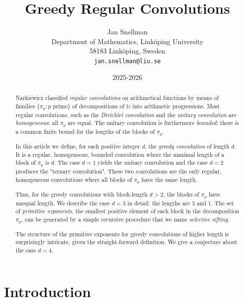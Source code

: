 \documentclass[12pt]{article}
\author{Jan Snellman \\ Department of Mathematics, Link{\"o}ping University \\ 58183 Link{\"o}ping, Sweden \\ \texttt{jan.snellman@liu.se}}
\date{2025-2026}
\title{Greedy Regular Convolutions}
\theoremstyle{definition}
\theoremstyle{remark}
\theoremstyle{plain}
\newcommand{\NN}{{\mathbb{N}}}
\begin{document}
\maketitle





\begin{abstract}
Narkiewicz classified  \emph{regular convolutions} on arithmetical functions
by means of families \(\{\pi_{p} : p \text{ prime}\}\) of decompositions of \(\NN\) into arithmetic
progressions. Most regular convolutions, such as the \emph{Dirichlet convolution}
and the \emph{unitary convolution} are \emph{homogeneous}:  all \(\pi_{p}\) are equal.
The unitary convolution is furthermore \emph{bounded}: there is a common finite bound for
the lengths of the blocks  of \(\pi_{p}\).

In this article we define, for each positive integer \(d\),  the \emph{greedy convolution} of length \(d\).
It is a regular, homogeneous, bounded convolution where the maximal length of a block of \(\pi_{p}\) is \(d\).
The case \(d=1\) yields the unitary convolution and the case \(d=2\) produces the "ternary convolution".
These two convolutions are the only regular, homogeneous convolutions where
all blocks of \(\pi_{p}\) have the same length.

Thus, for the greedy convolutions with block-length \(d > 2\), the blocks of \(\pi_{p}\) have unequal length.
We describe the case \(d=3\) in detail: the lengths are 3 and 1.
The set of \emph{primitive exponents}, the smallest positive element of each block in the decomposition \(\pi_{p}\),
can be generated by a simple recursive procedure that we name \emph{selective sifting}.

The structure of the primitive exponents for greedy convolutions of higher length is surprisingly
intricate, given the straight-forward definition. We give a conjecture about the case \(d=4\).
\end{abstract}
\section{Introduction}
\label{sec:orged176b9}
\end{document}
